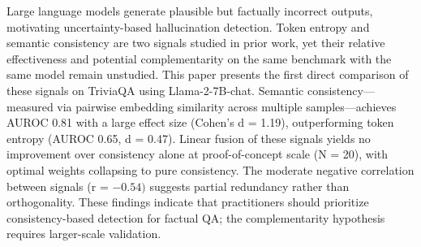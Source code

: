 
Large language models generate plausible but factually incorrect outputs, motivating uncertainty-based hallucination detection. Token entropy and semantic consistency are two signals studied in prior work, yet their relative effectiveness and potential complementarity on the same benchmark with the same model remain unstudied. This paper presents the first direct comparison of these signals on TriviaQA using Llama-2-7B-chat. Semantic consistency---measured via pairwise embedding similarity across multiple samples---achieves AUROC 0.81 with a large effect size (Cohen's d = 1.19), outperforming token entropy (AUROC 0.65, d = 0.47). Linear fusion of these signals yields no improvement over consistency alone at proof-of-concept scale (N = 20), with optimal weights collapsing to pure consistency. The moderate negative correlation between signals (r = $-0.54)$ suggests partial redundancy rather than orthogonality. These findings indicate that practitioners should prioritize consistency-based detection for factual QA; the complementarity hypothesis requires larger-scale validation.

